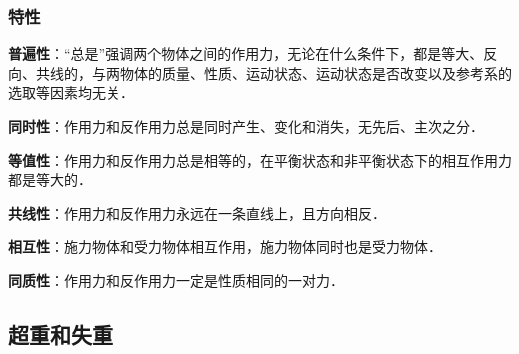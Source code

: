 \subsubsection{特性}

\textbf{普遍性}：“总是”强调两个物体之间的作用力，无论在什么条件下，都是等大、反向、共线的，与两物体的质量、性质、运动状态、运动状态是否改变以及参考系的选取等因素均无关．

\textbf{同时性}：作用力和反作用力总是同时产生、变化和消失，无先后、主次之分．

\textbf{等值性}：作用力和反作用力总是相等的，在平衡状态和非平衡状态下的相互作用力都是等大的．

\textbf{共线性}：作用力和反作用力永远在一条直线上，且方向相反．

\textbf{相互性}：施力物体和受力物体相互作用，施力物体同时也是受力物体．

\textbf{同质性}：作用力和反作用力一定是性质相同的一对力．

\subsection{超重和失重}

